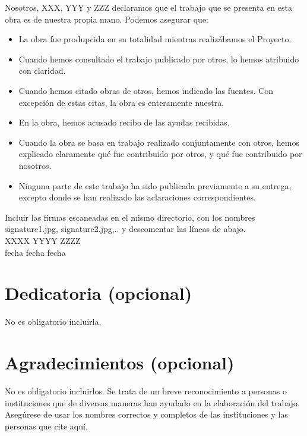 \documentclass[12pt,a4paper,oneside]{book}
\begin{document}
Nosotros, XXX, YYY y ZZZ declaramos que el trabajo que se presenta en esta obra es de nuestra
propia mano. Podemos asegurar que:
\begin{itemize}
\item La obra fue produpcida en su totalidad mientras realizábamos el Proyecto.
\item Cuando hemos consultado el trabajo publicado por otros, lo hemos atribuido con claridad.
\item Cuando hemos citado obras de otros, hemos indicado las fuentes. Con excepción de estas citas, la obra es enteramente nuestra.
\item En la obra, hemos acusado recibo de las ayudas recibidas.
\item Cuando la obra se basa en trabajo realizado conjuntamente con otros, hemos explicado claramente qué fue contribuido por otros, y qué fue contribuido por nosotros.
\item Ninguna parte de este trabajo ha sido publicada previamente a su entrega, excepto donde se han realizado las aclaraciones correspondientes.
\end{itemize}

 
\vspace{2cm}


\noindent Incluir las firmas escaneadas en el mismo directorio, con los nombres signature1.jpg, signature2.jpg,.. y descomentar las líneas de abajo.\\


XXXX \hfill YYYY \hfill ZZZZ\\

fecha \hfill fecha \hfill fecha



\chapter*{Dedicatoria (opcional)}

No es obligatorio incluirla.



\chapter*{Agradecimientos (opcional)}
No es obligatorio incluirlos. Se trata de un breve reconocimiento a personas o instituciones que de diversas maneras han ayudado en la elaboración del trabajo. 
Asegúrese de usar los nombres correctos y completos de las instituciones y las personas que cite aquí.
\end{document}
